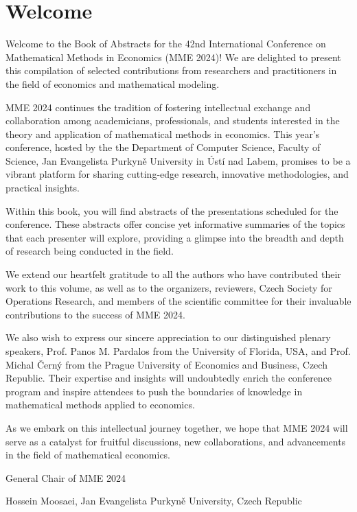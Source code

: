 \chapter{Welcome}

Welcome to the Book of Abstracts for the 42nd International Conference on Mathematical Methods in Economics (MME 2024)! We are delighted to present this compilation of selected contributions from researchers and practitioners in the field of economics and mathematical modeling.

MME 2024 continues the tradition of fostering intellectual exchange and collaboration among academicians, professionals, and students interested in the theory and application of mathematical methods in economics. This year's conference, hosted by the the Department of Computer Science, Faculty of Science, Jan Evangelista Purkyně University in Ústí nad Labem, promises to be a vibrant platform for sharing cutting-edge research, innovative methodologies, and practical insights.

Within this book, you will find abstracts of the presentations scheduled for the conference. These abstracts offer concise yet informative summaries of the topics that each presenter will explore, providing a glimpse into the breadth and depth of research being conducted in the field.

We extend our heartfelt gratitude to all the authors who have contributed their work to this volume, as well as to the organizers, reviewers, Czech Society for Operations Research, and members of the scientific committee for their invaluable contributions to the success of MME 2024.

We also wish to express our sincere appreciation to our distinguished plenary speakers, Prof. Panos M. Pardalos from the University of Florida, USA, and Prof. Michal Černý from the Prague University of Economics and Business, Czech Republic. Their expertise and insights will undoubtedly enrich the conference program and inspire attendees to push the boundaries of knowledge in mathematical methods applied to economics.

As we embark on this intellectual journey together, we hope that MME 2024 will serve as a catalyst for fruitful discussions, new collaborations, and advancements in the field of mathematical economics.

General Chair of MME 2024

Hossein Moosaei, Jan Evangelista Purkyně University, Czech Republic

